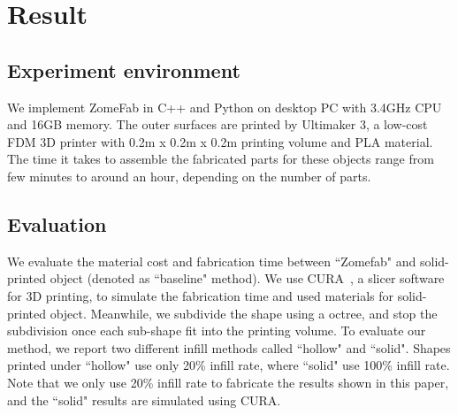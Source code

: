 \section{Result}
\label{sec:result}

\subsection{Experiment environment}
We implement ZomeFab in C++ and Python on desktop PC with 3.4GHz CPU and 16GB memory. 
The outer surfaces are printed by Ultimaker 3, a low-cost FDM 3{D} printer with 0.2m x 0.2m x 0.2m printing volume and PLA material. 
The time it takes to assemble the fabricated parts for these objects range from few minutes to around an hour, depending on the number of parts.

\subsection{Evaluation}
We evaluate the material cost and fabrication time between ``Zomefab" and solid-printed object (denoted as ``baseline" method).
We use CURA~\cite{cura}, a slicer software for 3{D} printing, to simulate the fabrication time and used materials for solid-printed object.
Meanwhile, we subdivide the shape using a octree, and stop the subdivision once each sub-shape fit into the printing volume.
To evaluate our method, we report two different infill methods called ``hollow" and ``solid".
Shapes printed under ``hollow" use only 20\% infill rate, where ``solid" use 100\% infill rate.
Note that we only use 20\% infill rate to fabricate the results shown in this paper, and the ``solid" results are simulated using CURA.

